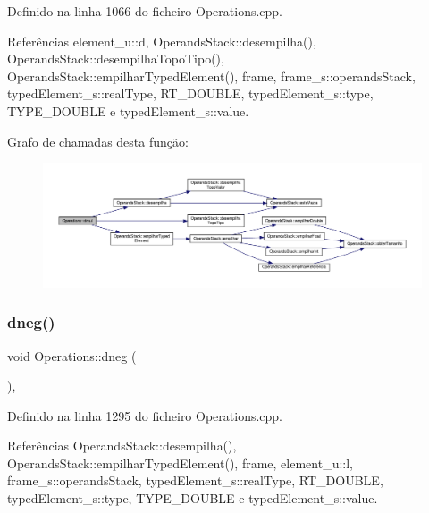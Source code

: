Definido na linha 1066 do ficheiro Operations.\+cpp.



Referências element\+\_\+u\+::d, Operands\+Stack\+::desempilha(), Operands\+Stack\+::desempilha\+Topo\+Tipo(), Operands\+Stack\+::empilhar\+Typed\+Element(), frame, frame\+\_\+s\+::operands\+Stack, typed\+Element\+\_\+s\+::real\+Type, R\+T\+\_\+\+D\+O\+U\+B\+LE, typed\+Element\+\_\+s\+::type, T\+Y\+P\+E\+\_\+\+D\+O\+U\+B\+LE e typed\+Element\+\_\+s\+::value.

Grafo de chamadas desta função\+:\nopagebreak
\begin{figure}[H]
\begin{center}
\leavevmode
\includegraphics[width=350pt]{classOperations_afe1944066f35f66d588d1a28124ebb55_cgraph}
\end{center}
\end{figure}
\mbox{\label{classOperations_a04f5d4f85b80f4c04216cd0259d3d7dc}} 
\subsubsection{\texorpdfstring{dneg()}{dneg()}}
{\footnotesize\ttfamily void Operations\+::dneg (\begin{DoxyParamCaption}{ }\end{DoxyParamCaption})\hspace{0.3cm}{\ttfamily [static]}, {\ttfamily [private]}}



Definido na linha 1295 do ficheiro Operations.\+cpp.



Referências Operands\+Stack\+::desempilha(), Operands\+Stack\+::empilhar\+Typed\+Element(), frame, element\+\_\+u\+::l, frame\+\_\+s\+::operands\+Stack, typed\+Element\+\_\+s\+::real\+Type, R\+T\+\_\+\+D\+O\+U\+B\+LE, typed\+Element\+\_\+s\+::type, T\+Y\+P\+E\+\_\+\+D\+O\+U\+B\+LE e typed\+Element\+\_\+s\+::value.

